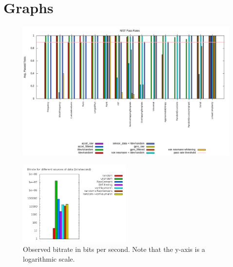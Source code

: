 \documentclass[conference]{IEEEtran}
\begin{document}

%
%
%





\appendix
\section{Graphs}

\onecolumn
\begin{figure}[htbp]
    \centering
	\includegraphics[angle=270,scale=0.5]{nist_results.png}
	\caption{}
    \label{nist_results}
\end{figure}
\twocolumn

\begin{figure}[h]
	\centering
	\includegraphics[width=0.5\textwidth]{bitrate.png}
	\caption{Observed bitrate in bits per second.  Note that the y-axis is 
a logarithmic scale.}
	\label{fig:bitrates}
\end{figure}

\end{document}
